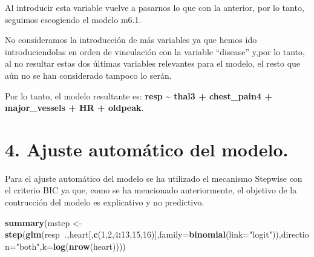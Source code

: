 \documentclass[]{article}
\newenvironment{Shaded}{\begin{snugshade}}{\end{snugshade}}
\newcommand{\KeywordTok}[1]{\textcolor[rgb]{0.13,0.29,0.53}{\textbf{#1}}}
\newcommand{\DataTypeTok}[1]{\textcolor[rgb]{0.13,0.29,0.53}{#1}}
\newcommand{\DecValTok}[1]{\textcolor[rgb]{0.00,0.00,0.81}{#1}}
\newcommand{\StringTok}[1]{\textcolor[rgb]{0.31,0.60,0.02}{#1}}
\newcommand{\OperatorTok}[1]{\textcolor[rgb]{0.81,0.36,0.00}{\textbf{#1}}}
\newcommand{\NormalTok}[1]{#1}
\begin{document}
Al introducir esta variable vuelve a pasarnos lo que con la anterior,
por lo tanto, seguimos escogiendo el modelo m6.1.

No consideramos la introducción de más variables ya que hemos ido
introduciendolas en orden de vinculación con la variable ``disease''
y,por lo tanto, al no resultar estas dos últimas variables relevantes
para el modelo, el resto que aún no se han considerado tampoco lo serán.

Por lo tanto, el modelo resultante es: \textbf{resp \textasciitilde{}
thal3 + chest\_pain4 + major\_vessels + HR + oldpeak}.

\section{4. Ajuste automático del
modelo.}\label{ajuste-automatico-del-modelo.}

Para el ajuste automático del modelo se ha utilizado el mecanismo
Stepwise con el criterio BIC ya que, como se ha mencionado
anteriormente, el objetivo de la contrucción del modelo es explicativo y
no predictivo.

\begin{Shaded}
\begin{Highlighting}[]
\KeywordTok{summary}\NormalTok{(mstep <-}\StringTok{ }\KeywordTok{step}\NormalTok{(}\KeywordTok{glm}\NormalTok{(resp}\OperatorTok{~}\NormalTok{.,heart[,}\KeywordTok{c}\NormalTok{(}\DecValTok{1}\NormalTok{,}\DecValTok{2}\NormalTok{,}\DecValTok{4}\OperatorTok{:}\DecValTok{13}\NormalTok{,}\DecValTok{15}\NormalTok{,}\DecValTok{16}\NormalTok{)],}\DataTypeTok{family=}\KeywordTok{binomial}\NormalTok{(}\DataTypeTok{link=}\StringTok{"logit"}\NormalTok{)),}\DataTypeTok{direction=}\StringTok{"both"}\NormalTok{,}\DataTypeTok{k=}\KeywordTok{log}\NormalTok{(}\KeywordTok{nrow}\NormalTok{(heart))))}
\end{Highlighting}
\end{Shaded}
\end{document}
